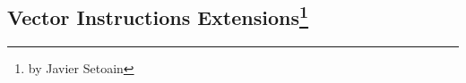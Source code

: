 \subsection[Vector Instruction Extensions]{Vector Instructions Extensions\footnote{by Javier Setoain}}
